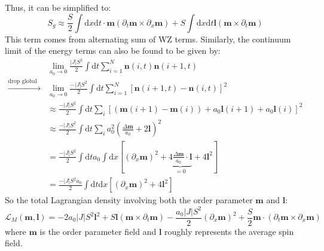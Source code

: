 Thus, it can be simplified to:
\begin{equation}
S_g \approx \frac{S}{2} \int \mathrm{d}x \mathrm{d}t \cdot \bm{m} (\partial_t \bm{m} \times \partial_x \bm{m}) + S \int \mathrm{d}x \mathrm{d}t \bm{l} (\bm{m} \times \partial_t \bm{m})
\end{equation}
This term comes from alternating sum of WZ terms.
Similarly, the continuum limit of the energy terms can also be found to be given by:
\begin{equation}
\begin{aligned}
&\lim_{a_0 \to 0} \frac{|J|S^2}{2} \int \mathrm{d}t \sum_{i=1}^N \bm{n}(i,t) \bm{n}(i+1,t) \\
\xrightarrow{\text{drop global phase}} &\lim_{a_0 \to 0} \frac{-|J|S^2}{2} \int \mathrm{d}t \sum_{i=1}^N [\bm{n}(i+1,t) - \bm{n}(i,t)]^2 \\
&\approx \frac{-|J|S^2}{2} \int \mathrm{d}t \sum_i [ (\bm{m}(i+1) - \bm{m}(i)) + a_0 \bm{l}(i+1) + a_0 \bm{l}(i) ]^2 \\
&\approx \frac{-|J|S^2}{2} \int \mathrm{d}t \sum_i a_0^2 (\frac{\Delta \bm{m}}{a_0} + 2\bm{l})^2 \\
&= \frac{-|J|S^2}{2} \int \mathrm{d}t a_0 \int \mathrm{d}x [ (\partial_x \bm{m})^2 + \underbrace{4 \frac{\Delta \bm{m}}{a_0} \cdot \bm{l}}_{=0} + 4\bm{l}^2 ] \\
&= \frac{-|J|S^2 a_0}{2} \int \mathrm{d}t \mathrm{d}x [ (\partial_x \bm{m})^2 + 4\bm{l}^2 ]
\end{aligned}
\end{equation}
So the total Lagrangian density involving both the order parameter $\bm{m}$ and $\bm{l}$:
\begin{equation}
\mathcal{L}_M(\bm{m}, \bm{l}) = -2 a_0 |J| S^2 \bm{l}^2 + S \bm{l} (\bm{m} \times \partial_t \bm{m}) - \frac{a_0 |J| S^2}{2} (\partial_x \bm{m})^2 + \frac{S}{2} \bm{m} \cdot (\partial_t \bm{m} \times \partial_x \bm{m})
\end{equation}
where $\bm{m}$ is the order parameter field and $\bm{l}$ roughly represents the average spin field.

